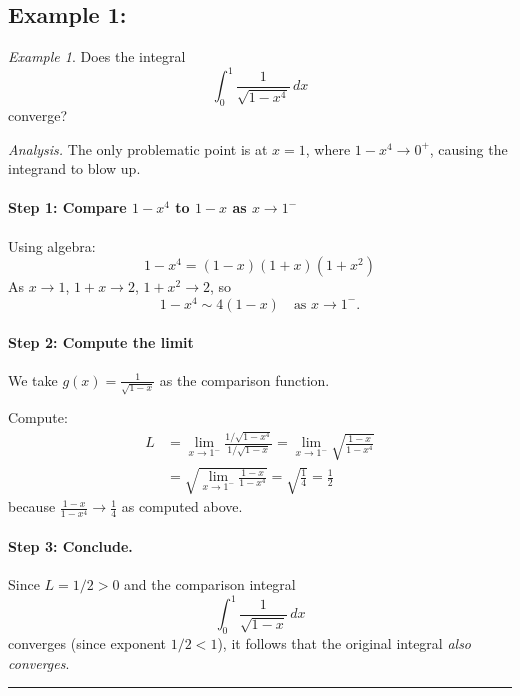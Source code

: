 \documentclass[12pt]{article}
\theoremstyle{definition}
\theoremstyle{plain}
\theoremstyle{remark}
\newtheorem{example}[definition]{Example}
\begin{document}
\subsection{Example 1:}
\begin{example}
\label{ex:quartic-root}
Does the integral
\[
\int_0^1 \frac{1}{\sqrt{1 - x^4}}\,dx
\]
converge?

\emph{Analysis.} The only problematic point is at $x=1$, where $1-x^4 \to 0^{+}$, causing the integrand to blow up.

\paragraph{Step 1: Compare $1 - x^4$ to $1-x$ as $x\to1^-$}
Using algebra:
\[
1 - x^4 = (1 - x)(1 + x)(1 + x^2)
\]
As $x\to1$, $1+x\to2$, $1 + x^2\to2$, so
\[
1 - x^4 \sim 4(1 - x) \quad \text{as } x \to 1^-.
\]

\paragraph{Step 2: Compute the limit}
We take $g(x) = \frac{1}{\sqrt{1-x}}$ as the comparison function.

Compute:
\begin{align*}
L &= \lim_{x\to1^-} \frac{1/\sqrt{1-x^4}}{1/\sqrt{1-x}} = \lim_{x\to1^-} \sqrt{\frac{1-x}{1-x^4}} \\
  &= \sqrt{\lim_{x\to1^-} \frac{1-x}{1-x^4}} = \sqrt{\frac{1}{4}} = \frac{1}{2}
\end{align*}
because $\frac{1-x}{1-x^4} \to \frac{1}{4}$ as computed above.

\paragraph{Step 3: Conclude.}
Since $L = 1/2 > 0$ and the comparison integral
\[
\int_0^1 \frac{1}{\sqrt{1-x}}\,dx
\]
converges (since exponent $1/2 < 1$), it follows that the original integral \emph{also converges}.
\end{example}

\hrule
\end{document}
